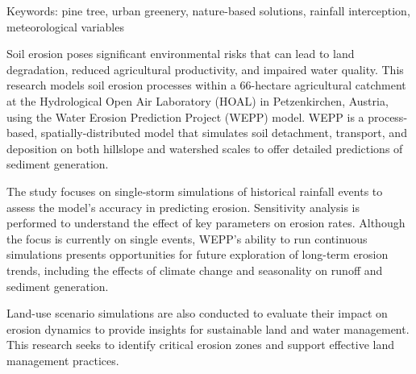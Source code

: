 Keywords: pine tree, urban greenery, nature-based solutions, rainfall interception, meteorological variables
\newpage{}
{}
\begin{flushleft}






\end{flushleft}

\noindent

Soil erosion poses significant environmental risks that can lead to land degradation, reduced agricultural productivity, and impaired water quality. This research models soil erosion processes within a 66-hectare agricultural catchment at the Hydrological Open Air Laboratory (HOAL) in Petzenkirchen, Austria, using the Water Erosion Prediction Project (WEPP) model. WEPP is a process-based, spatially-distributed model that simulates soil detachment, transport, and deposition on both hillslope and watershed scales to offer detailed predictions of sediment generation.

The study focuses on single-storm simulations of historical rainfall events to assess the model’s accuracy in predicting erosion. Sensitivity analysis is performed to understand the effect of key parameters on erosion rates. Although the focus is currently on single events, WEPP’s ability to run continuous simulations presents opportunities for future exploration of long-term erosion trends, including the effects of climate change and seasonality on runoff and sediment generation.

Land-use scenario simulations are also conducted to evaluate their impact on erosion dynamics to provide insights for sustainable land and water management. This research seeks to identify critical erosion zones and support effective land management practices.

